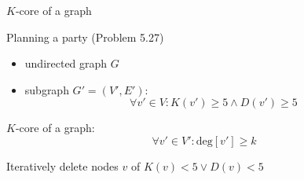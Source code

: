 \begin{frame}{$K$-core of a graph}
  \begin{exampleblock}{Planning a party (Problem 5.27)}
	\begin{itemize}
	  \item undirected graph $G$
	  \item subgraph $G' = (V', E')$:
		\[
		  \forall v' \in V: K(v') \ge 5 \land D(v') \ge 5
		\]
	\end{itemize}
  \end{exampleblock}

  \pause
  \vspace{0.50cm}
  $K$-core of a graph:
  \[
	\forall v' \in V': \text{deg}[v'] \ge k
  \]

  \pause
  \vspace{0.50cm}
  \centerline{Iteratively delete nodes $v$ of $K(v) < 5 \lor D(v) < 5$}
\end{frame}
